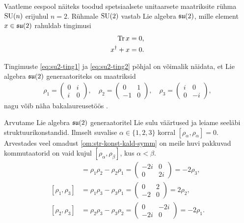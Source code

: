\begin{naide}
    Vaatleme eespool näiteks toodud spetsiaalsete unitaarsete maatriksite
    rühma $\operatorname{SU}(n)$ erijuhul $n = 2$. Rühmale $\operatorname{SU}(2)$ vastab Lie algebra
    $\mathfrak{su}(2)$, mille
    element $x \in \mathfrak{su}(2)$ rahuldab tingimusi
    \begin{align}
        \operatorname{Tr} x = 0,\label{eq:su2-ting1} \\
        x^\dag + x = 0.\label{eq:su2-ting2}
    \end{align}

    Tingimuste \eqref{eq:su2-ting1} ja \eqref{eq:su2-ting2} põhjal
    on võimalik näidata, et Lie algebra $\mathfrak{su}(2)$ generaatoriteks
    on maatriksid
    \begin{align*}
        \rho_1 = \begin{pmatrix}
            0 & i \\
            i & 0
        \end{pmatrix},
        \quad
        \rho_2 = \begin{pmatrix}
            0 & 1 \\
            -1 & 0
        \end{pmatrix},
        \quad
        \rho_3 = \begin{pmatrix}
            i & 0 \\
            0 & -i
        \end{pmatrix},
    \end{align*}
    nagu võib näha bakalaureusetöös \cite{latt2013}.

    Arvutame Lie algebra $\mathfrak{su}(2)$ generaatoritel Lie sulu väärtused
    ja leiame seeläbi struktuurikonstandid. Ilmselt suvalise
    $\alpha \in \{1, 2, 3\}$ korral $[\rho_\alpha, \rho_\alpha] = 0$.
    Arvestades veel omadust \eqref{om:str-konst-kald-symm} on meile
    huvi pakkuvad kommutaatorid on vaid kujul
    $[\rho_\alpha, \rho_\beta]$, kus $\alpha < \beta$.
    \begin{align}
        [\rho_1, \rho_2] &= \rho_1 \rho_2 - \rho_2 \rho_1 =
            \begin{pmatrix}
                -2i &  0 \\
                  0 & 2i
            \end{pmatrix} = -2 \rho_3,
            \label{eq:str-konst-naide-brac-1}\\[0.1cm]
        [\rho_1, \rho_3] &= \rho_1 \rho_3 - \rho_3 \rho_1 =
            \begin{pmatrix}
                 0 & 2 \\
                -2 & 0
            \end{pmatrix} = 2 \rho_2,
            \label{eq:str-konst-naide-brac-2}\\[0.1cm]
        [\rho_2, \rho_3] &= \rho_2 \rho_3 - \rho_3 \rho_2 =
            \begin{pmatrix}
                  0 & -2i \\
                -2i & 0
            \end{pmatrix} = -2 \rho_1.
            \label{eq:str-konst-naide-brac-3}
    \end{align}


\end{naide}
